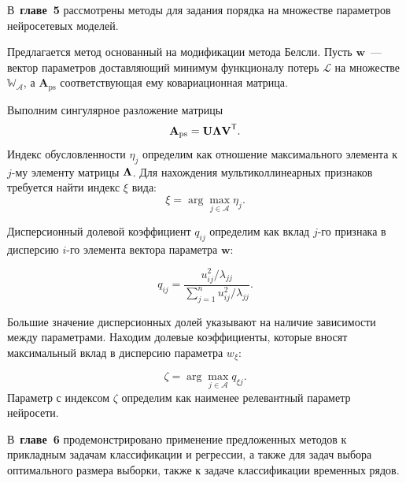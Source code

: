 \documentclass{dissert}
\begin{document}
В~\textbf{главе~5} рассмотрены методы для задания порядка на множестве параметров нейросетевых моделей.

Предлагается метод основанный на модификации метода Белсли. Пусть $\textbf{w}$~--- вектор параметров доставляющий минимум функционалу потерь $\mathcal{L}$ на  множестве $\mathbb{W_\mathcal{A}}$, а $\textbf{A}_\text{ps}$ соответствующая ему ковариационная матрица.

Выполним сингулярное разложение матрицы
\[
\textbf{A}_\text{ps} = \textbf{U}{\bf\Lambda}\textbf{V}^\mathsf{T}.
\]
Индекс обусловленности $\eta_{j}$ определим как отношение максимального элемента к $j$-му элементу матрицы ${\bf\Lambda}$. Для нахождения мультиколлинеарных признаков требуется найти индекс $\xi$ вида:
\[
\xi = \arg\max_{j\in \mathcal{A}}{\eta_j}.
\]

Дисперсионный долевой коэффициент $q_{ij}$ определим как вклад $j$-го признака в дисперсию $i$-го элемента вектора параметра $\textbf{w}$:

\[
q_{ij} = \frac{u^2_{ij}/\lambda_{jj}}{\sum^n_{j=1}{u^2_{ij}/\lambda_{jj}}}.
\]

Большие значение дисперсионных долей указывают на наличие зависимости между параметрами. Находим долевые коэффициенты, которые вносят максимальный вклад в дисперсию параметра $w_\xi$:

\[
\zeta = \arg\max_{j\in \mathcal{A}}{q_{\xi j}}.
\]
Параметр с индексом $\zeta$ определим как наименее релевантный параметр нейросети.

В~\textbf{главе~6} продемонстрировано применение предложенных методов к прикладным задачам классификации и регрессии, а также для задач выбора оптимального размера выборки, также к задаче классификации временных рядов.
\end{document}
